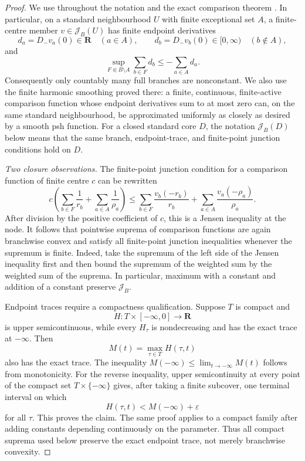 \begin{proof}
We use throughout the notation and the exact comparison theorem
.  In particular, on a
standard neighbourhood \(U\) with finite exceptional set \(A\), a
finite-centre member \(v\in\mathscr J_B(U)\) has finite endpoint
derivatives
\[
 d_a=D_-v_a(0)\in\mathbf R\quad(a\in A),
 \qquad
 d_b=D_-v_b(0)\in[0,\infty)\quad(b\notin A),
\]
and
\begin{equation}
 \sup_{F\Subset B\setminus A}\sum_{b\in F}d_b
       \leq-\sum_{a\in A}d_a .
 \label{eq:p071-stone-infinite-slope-budget}
\end{equation}
Consequently only countably many full branches are nonconstant.
We also use the finite harmonic smoothing proved there: a finite,
continuous, finite-active comparison function whose endpoint derivatives
sum to at most zero can, on the same standard neighbourhood, be
approximated uniformly as closely as desired by a smooth psh function.
For a closed standard core \(D\), the notation
\(\mathscr J_B(D)\) below means that the same branch, endpoint-trace, and
finite-point junction conditions hold on \(D\).

\medskip\noindent
\emph{Two closure observations.}
The finite-point junction condition for a comparison function of finite
centre \(c\) can be rewritten
\begin{equation}
 c\left(\sum_{b\in F}\frac1{r_b}
            +\sum_{a\in A}\frac1{\rho_a}\right)
 \leq
 \sum_{b\in F}\frac{v_b(-r_b)}{r_b}
    +\sum_{a\in A}\frac{v_a(-\rho_a)}{\rho_a}.
 \label{eq:p071-stone-infinite-jensen-form}
\end{equation}
After division by the positive coefficient of \(c\), this is a Jensen
inequality at the node.  It follows that pointwise suprema of comparison
functions are again branchwise convex and satisfy all finite-point
junction inequalities whenever the supremum is finite.  Indeed, take the
supremum of the left side of the Jensen inequality first and then bound
the supremum of the weighted sum by the weighted sum of the suprema.
In particular, maximum with a constant and addition of a constant
preserve \(\mathscr J_B\).

Endpoint traces require a compactness qualification.  Suppose \(T\) is
compact and
\[
 H:T\times[-\infty,0]\longrightarrow\mathbf R
\]
is upper semicontinuous, while every \(H_\tau\) is nondecreasing and has
the exact trace at \(-\infty\).  Then
\[
 M(t)=\max_{\tau\in T}H(\tau,t)
\]
also has the exact trace.  The inequality
\(M(-\infty)\leq\lim_{t\to-\infty}M(t)\) follows from monotonicity.
For the reverse inequality, upper semicontinuity at every point of the
compact set \(T\times\{-\infty\}\) gives, after taking a finite
subcover, one terminal interval on which
\[
                         H(\tau,t)<M(-\infty)+\varepsilon
\]
for all \(\tau\).  This proves the claim.  The same proof applies to a
compact family after adding constants depending continuously on the
parameter.  Thus all compact suprema used below preserve the exact
endpoint trace, not merely branchwise convexity.


\end{proof}
